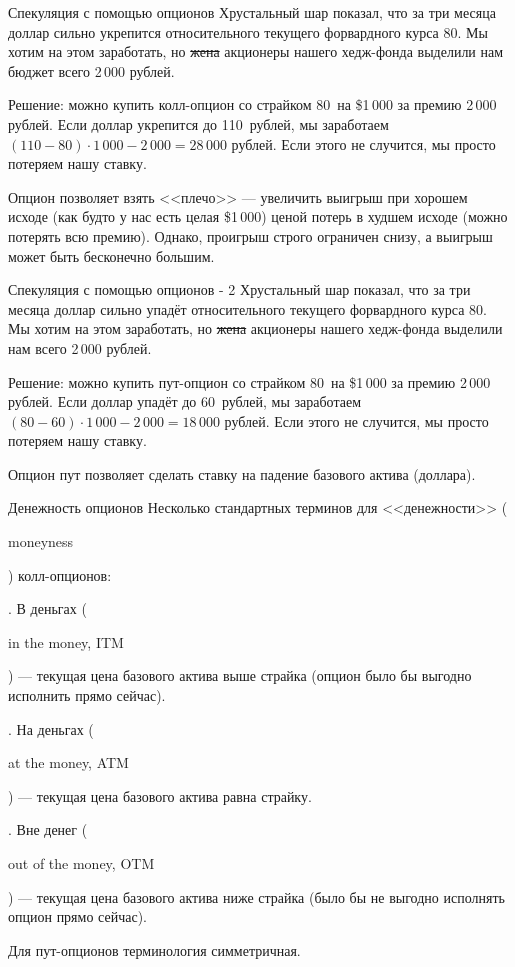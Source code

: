 \documentclass{beamer}
\newcommand{\en}[1]{\begin{otherlanguage}{english}#1\end{otherlanguage}}
\newcommand{\usdrubstrike}{80}
\newcommand{\usdrublow}{60}
\newcommand{\usdrubhigh}{110}
\newcommand{\highminusstrikepremium}{28}
\newcommand{\strikeminuslowpremium}{18}
\begin{document}
\begin{frame}{Спекуляция с помощью опционов}
\justify
Хрустальный шар показал, что за три месяца доллар сильно укрепится относительного текущего форвардного курса \usdrubstrike. Мы хотим на этом заработать, но \sout{жена} акционеры нашего хедж-фонда выделили нам бюджет всего 2\,000 рублей.

\justify
Решение: можно купить колл-опцион со страйком \usdrubstrike\ на \$1\,000 за премию 2\,000 рублей. Если доллар укрепится до \usdrubhigh\ рублей, мы заработаем $(\usdrubhigh - \usdrubstrike) \cdot 1\,000 - 2\,000 = \highminusstrikepremium\,000$ рублей. Если этого не случится, мы просто потеряем нашу ставку.

\justify
Опцион позволяет взять <<плечо>> --- увеличить выигрыш при хорошем исходе (как будто у нас есть целая \$1\,000) ценой потерь в худшем исходе (можно потерять всю премию). Однако, проигрыш строго ограничен снизу, а выигрыш может быть бесконечно большим.
\end{frame}



\begin{frame}{Спекуляция с помощью опционов - 2}
\justify
Хрустальный шар показал, что за три месяца доллар сильно упадёт относительного текущего форвардного курса \usdrubstrike. Мы хотим на этом заработать, но \sout{жена} акционеры нашего хедж-фонда выделили нам всего 2\,000 рублей.

\justify
Решение: можно купить пут-опцион со страйком \usdrubstrike\ на \$1\,000 за премию 2\,000 рублей. Если доллар упадёт до \usdrublow\ рублей, мы заработаем $(\usdrubstrike - \usdrublow) \cdot 1\,000 - 2\,000 = \strikeminuslowpremium\,000$ рублей. Если этого не случится, мы просто потеряем нашу ставку.

\justify
Опцион пут позволяет сделать ставку на падение базового актива (доллара).
\end{frame}



\begin{frame}{Денежность опционов}
\justify
Несколько стандартных терминов для <<денежности>> (\en{moneyness}) колл-опционов:

. В деньгах (\en{in the money, ITM}) --- текущая цена базового актива выше страйка (опцион было бы выгодно исполнить прямо сейчас).

. На деньгах (\en{at the money, ATM}) --- текущая цена базового актива равна страйку.

. Вне денег (\en{out of the money, OTM}) --- текущая цена базового актива ниже страйка (было бы не выгодно исполнять опцион прямо сейчас).

\justify
Для пут-опционов терминология симметричная.
\end{frame}
\end{document}

